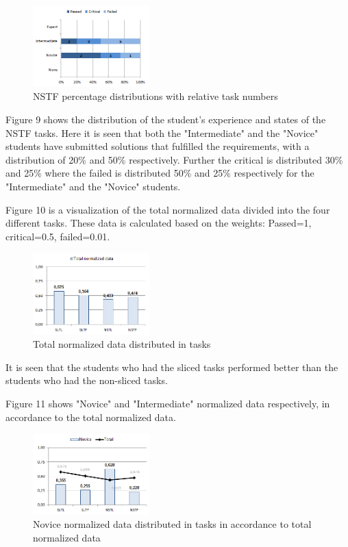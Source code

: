 \documentclass{sig-alternate-05-2015}
\begin{document}
\begin{figure}[H]
	\centering
	\includegraphics[width=0.4\textwidth]{img09}
	\caption{NSTF percentage distributions with relative task numbers}
\end{figure}

Figure 9 shows the distribution of the student's experience and states of the NSTF tasks. Here it is seen that both the "Intermediate" and the "Novice" students have submitted solutions that fulfilled the requirements, with a distribution of 20\% and 50\% respectively. Further the critical is distributed 30\% and 25\% where the failed is distributed 50\% and 25\% respectively for the "Intermediate" and the "Novice" students.

Figure 10 is a visualization of the total normalized data divided into the four different tasks. These data is calculated based on the weights: Passed=1, critical=0.5, failed=0.01.

\begin{figure}[H]
	\centering
	\includegraphics[width=0.4\textwidth]{img10}
	\caption{Total normalized data distributed in tasks}
\end{figure}

It is seen that the students who had the sliced tasks performed better than the students who had the non-sliced tasks.

Figure 11 shows "Novice" and "Intermediate" normalized data respectively, in accordance to the total normalized data.

\begin{figure}[H]
	\centering
	\includegraphics[width=0.4\textwidth]{img11}
	\caption{Novice normalized data distributed in tasks in accordance to total normalized data}
\end{figure}
\end{document}
